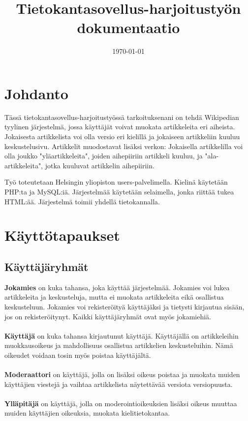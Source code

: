 \documentclass[12pt]{article}
\title{Tietokantasovellus-harjoitustyön dokumentaatio}
\date{\today}
\begin{document}
  \maketitle
  \newpage
  \tableofcontents
  \newpage

  \section{Johdanto}
    Tässä tietokantasovellus-harjoitustyössä tarkoituksenani on tehdä Wikipedian tyylinen järjestelmä, jossa käyttäjät voivat muokata artikkeleita eri aiheista. Jokaisesta artikkelista voi olla versio eri kielillä ja jokaiseen artikkeliin kuuluu keskustelusivu. Artikkelit muodostavat lisäksi verkon: Jokaisella artikkelilla voi olla joukko "yläartikkeleita", joiden aihepiiriin artikkeli kuuluu, ja "ala-artikkeleita", jotka kuuluvat artikkelin aihepiiriin.

    Työ toteutetaan Helsingin yliopiston users-palvelimella. Kielinä käytetään PHP:ta ja MySQL:iä. Järjestelmää käytetään selaimella, jonka riittää tukea HTML:ää. Järjestelmä toimii yhdellä tietokannalla.
  \newpage

  \section{Käyttötapaukset}
    \subsection{Käyttäjäryhmät}
      \textbf{Jokamies} on kuka tahansa, joka käyttää järjestelmää. Jokamies voi lukea artikkeleita ja keskusteluja, mutta ei muokata artikkeleita eikä osallistua keskusteluun. Jokamies voi rekisteröityä käyttäjäksi ja tietysti kirjautua sisään, jos on rekisteröitynyt. Kaikki käyttäjäryhmät ovat myös jokamiehiä.\\ \\
      \textbf{Käyttäjä} on kuka tahansa kirjautunut käyttäjä. Käyttäjällä on artikkeleihin muokkausoikeus ja mahdollisuus osallistua artikkelien keskusteluihin. Nämä oikeudet voidaan tosin myös poistaa käyttäjältä. \\ \\
      \textbf{Moderaattori} on käyttäjä, jolla on lisäksi oikeus poistaa ja muokata muiden käyttäjien viestejä ja vaihtaa artikkelista näytettävää versiota versiopuusta. \\ \\
      \textbf{Ylläpitäjä} on käyttäjä, jolla on moderointioikeuksien lisäksi oikeus muuttaa muiden käyttäjien oikeuksia, muokata kielitietokantaa.
\end{document}
